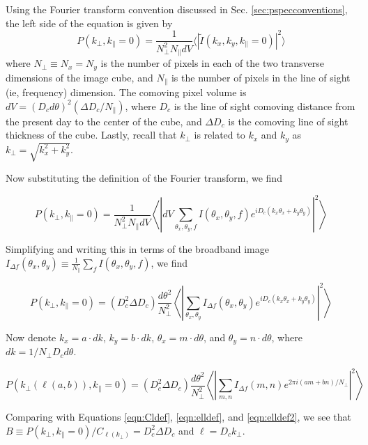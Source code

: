 \documentclass[numberedappendix]{emulateapj}
\begin{document}
Using the Fourier transform convention discussed in Sec. \ref{sec:pspecconventions}, the left side of the equation is given by
\begin{equation}
P(k_\perp,k_\parallel=0) = \frac{1}{N_\perp^2 N_\parallel dV}\langle|\tilde{I}(k_x,k_y,k_\parallel=0)|^2\rangle
\end{equation}
where $N_\perp\equiv N_x=N_y$ is the number of pixels in each of the two transverse dimensions of the image cube, and $N_\parallel$ is the number of pixels in the line of sight (ie, frequency) dimension. The comoving pixel volume is $dV = (D_c d\theta)^2 (\Delta D_c/N_\parallel)$, where $D_c$ is the line of sight comoving distance from the present day to the center of the cube, and $\Delta D_c$ is the comoving line of sight thickness of the cube. Lastly, recall that $k_\perp$ is related to $k_x$ and $k_y$ as $k_\perp=\sqrt{k_x^2+k_y^2}$.

Now substituting the definition of the Fourier transform, we find

\begin{equation}
P(k_\perp,k_\parallel=0) =\frac{1}{N_\perp^2 N_\parallel dV}\left\langle\left|dV\sum_{\theta_x,\theta_y,f}I(\theta_x,\theta_y,f)e^{iD_c(k_x\theta_x+k_y\theta_y)}\right|^2\right\rangle
\end{equation}

Simplifying and writing this in terms of the broadband image $I_{\Delta f}(\theta_x,\theta_y)\equiv\frac{1}{N_\parallel}\sum_f  I(\theta_x,\theta_y,f)$, we find

\begin{equation}
P(k_\perp,k_\parallel=0) =(D_c^2 \Delta D_c)
\frac{d\theta^2}{N_\perp^2}\left\langle\left|\sum_{\theta_x,\theta_y}I_{\Delta f}(\theta_x,\theta_y)e^{iD_c(k_x\theta_x+k_y\theta_y)}\right|^2\right\rangle
\end{equation}

Now denote $k_x=a\cdot dk$, $k_y=b\cdot dk$, $\theta_x=m\cdot d\theta$, and $\theta_y=n\cdot d\theta$, where $dk = 1/N_\perp D_c d\theta$. 

\begin{equation}
P(k_\perp(\ell(a,b)),k_\parallel=0) =(D_c^2 \Delta D_c)
\frac{d\theta^2}{N_\perp^2}\left\langle\left|\sum_{m,n}I_{\Delta f}(m,n)e^{2\pi i(am + bn)/N_\perp}\right|^2\right\rangle
\end{equation}

Comparing with Equations \ref{eqn:Cldef}, \ref{eqn:elldef}, and \ref{eqn:elldef2}, we see that $B\equiv P(k_\perp,k_\parallel=0)/ C_{\ell(k_\perp)}=D_c^2 \Delta D_c$ and $\ell=D_c k_\perp$.
\end{document}
